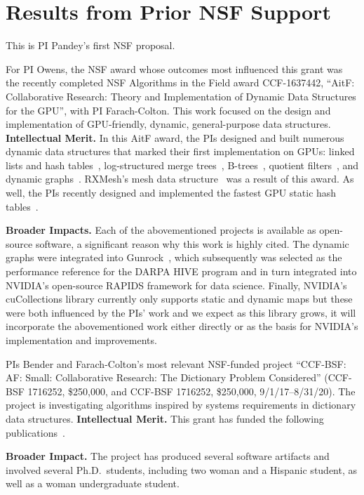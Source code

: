 \section{Results from Prior NSF Support}

This is PI Pandey's first NSF proposal.

For PI Owens, the NSF award whose outcomes most influenced this grant was the recently completed NSF Algorithms in the Field award CCF-1637442, ``AitF\@: Collaborative Research: Theory and Implementation of Dynamic Data Structures for the GPU'', with PI Farach-Colton. This work focused on the design and implementation of GPU-friendly, dynamic, general-purpose data structures.
\textbf{Intellectual Merit.} In this AitF award, the PIs designed and built numerous dynamic data structures that marked their first implementation on GPUs: linked lists and hash tables~\cite{Ashkiani:2018:ADH}, log-structured merge trees~\cite{Ashkiani:2018:GLA}, B-trees~\cite{Awad:2019:EAH}, quotient filters~\cite{Geil:2018:QFA}, and dynamic graphs~\cite{Awad:2020:DGO}. RXMesh's mesh data structure~\cite{Mahmoud:2021:RAG} was a result of this award. As well, the PIs recently designed and implemented the fastest GPU static hash tables~\cite{Awad:2023:AAI}.

\textbf{Broader Impacts.} Each of the abovementioned projects is available as open-source software, a significant reason why this work is highly cited. The dynamic graphs were integrated into Gunrock~\cite{Awad:2020:DGO,Wang:2017:GGG}, which subsequently was selected as the performance reference for the DARPA HIVE program and in turn integrated into NVIDIA's open-source RAPIDS framework for data science. Finally, NVIDIA's cuCollections library currently only supports static and dynamic maps but these were both influenced by the PIs' work and we expect as this library grows, it will incorporate the abovementioned work either directly or as the basis for NVIDIA's implementation and improvements.

PIs Bender and Farach-Colton's most relevant NSF-funded project ``CCF-BSF\@: AF\@: Small: Collaborative Research: The Dictionary Problem Considered''
(CCF-BSF 1716252, \$250,000, and CCF-BSF 1716252, \$250,000, 9/1/17--8/31/20).
The project is investigating algorithms inspired by systems requirements in dictionary data structures.
\textbf{Intellectual Merit.} This grant has funded the following
publications~\cite{AgrawalBeDa20,AgrawalBeFi20,%
ArkinDaGa20,AshkianiFaOw18,AshkianiLiFa18,BenderChDa20,BenderCoFa19,BenderDaJo20,BenderFaGo18,%
BenderFaKu19,BenderGoMe20,BenderKoKu20,ChenMcSi18,ConwayBaJi17b,ConwayFaSh18,ConwayKnJi19,%
DasAgBe20,DasTsDu18,DasTsDu19,BerceaEv20a,BerceaEv20b,%
ZhanCoJi18,ZhanJaPo18,ZhanJaPo18,Mayer18,Pandey19,PandeyAlBe18,PandeyBeJo17a,%
PandeyBeJo17b,PandeyBeJo17c,PandeyBeJo18,Singh18,SinghMaBe20,%
JavanmardGaDa19PPoPP,%
JavanmardGaDa19DISC,%
GoswamiMeMe18,%
GeilFaOw18,PandeySiBe20,%
EvenMeRa18,ConwayFaSh18,AwadAsJo19,BenderFiGi19,Farach-ColtonLiTs18,BenderKoPe18}.

\textbf{Broader Impact.} The project has produced several software artifacts and involved several Ph.D.\ students, including two woman and a Hispanic student, as well as a woman undergraduate student.
